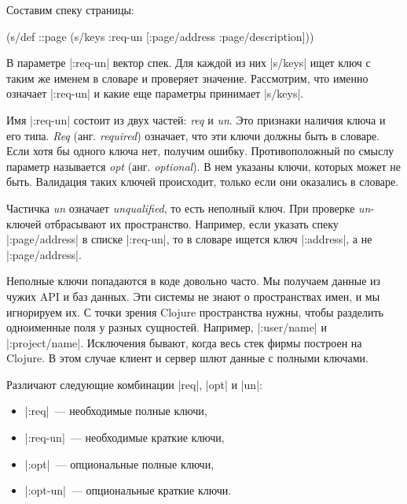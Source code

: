 Составим спеку страницы:

\begin{english}
  \begin{clojure}
(s/def ::page
  (s/keys :req-un [:page/address
                   :page/description]))
  \end{clojure}
\end{english}

В параметре \spverb|:req-un| вектор спек. Для каждой из них \spverb|s/keys| ищет
ключ с таким же именем в словаре и проверяет значение. Рассмотрим, что именно
означает \spverb|:req-un| и какие еще параметры принимает \spverb|s/keys|.

Имя \spverb|:req-un| состоит из двух частей: \emph{req} и \emph{un}. Это
признаки наличия ключа и его типа. \emph{Req} (анг. \emph{required}) означает,
что эти ключи должны быть в словаре. Если хотя бы одного ключа нет, получим
ошибку. Противоположный по смыслу параметр называется \emph{opt}
(анг. \emph{optional}). В нем указаны ключи, которых может не быть. Валидация
таких ключей происходит, только если они оказались в словаре.

Частичка \emph{un} означает \emph{unqualified}, то есть неполный ключ. При
проверке \emph{un}-ключей отбрасывают их пространство. Например, если указать
спеку \spverb|:page/address| в списке \spverb|:req-un|, то в словаре ищется ключ
\spverb|:address|, а не \spverb|:page/address|.

Неполные ключи попадаются в коде довольно часто. Мы получаем данные из чужих API
и баз данных. Эти системы не знают о пространствах имен, и мы игнорируем их. С
точки зрения Clojure пространства нужны, чтобы разделить одноименные поля у
разных сущностей. Например, \spverb|:user/name| и \spverb|:project/name|.
Исключения бывают, когда весь стек фирмы построен на Clojure. В этом случае
клиент и сервер шлют данные с полными ключами.

Различают следующие комбинации \spverb|req|, \spverb|opt| и \spverb|un|:

\begin{itemize}

\item
  \spverb|:req|~--- необходимые полные ключи,

\item
  \spverb|:req-un|~--- необходимые краткие ключи,

\item
  \spverb|:opt|~--- опциональные полные ключи,

\item
  \spverb|:opt-un|~--- опциональные краткие ключи.

\end{itemize}

